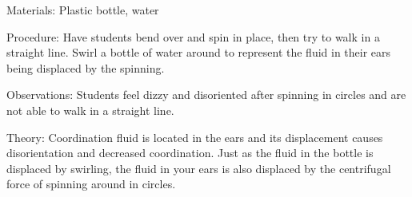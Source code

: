 \begin{multicols}{2}
\begin{description*}
\item[Materials:]{Plastic bottle, water}
\item[Procedure:]{Have students bend over and spin in place, then try to walk in a straight line. Swirl a bottle of water around to represent the fluid in their ears being displaced by the spinning.}
\item[Observations:]{Students feel dizzy and disoriented after spinning in circles and are not able to walk in a straight line.}
\item[Theory:]{Coordination fluid is located in the ears and its displacement causes disorientation and decreased coordination. Just as the fluid in the bottle is displaced by swirling, the fluid in your ears is also displaced by the centrifugal force of spinning around in circles.}
\end{description*}

%
%


\end{multicols}
